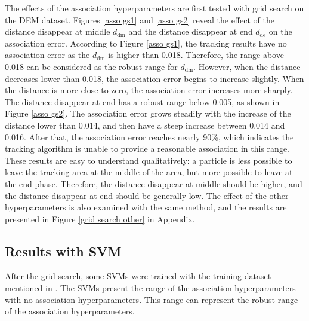 The effects of the association hyperparameters are first tested with grid search on the DEM dataset. Figures \ref{asso gs1} and \ref{asso gs2} reveal the effect of the distance disappear at middle $d_{\mathrm{dm}}$ and the distance disappear at end $d_{\mathrm{de}}$ on the association error. According to Figure \ref{asso gs1}, the tracking results have no association error as the $d_{\mathrm{dm}}$ is higher than 0.018. Therefore, the range above 0.018 can be considered as the robust range for $d_{\mathrm{dm}}$. However, when the distance decreases lower than 0.018, the association error begins to increase slightly. When the distance is more close to zero, the association error increases more sharply. The distance disappear at end has a robust range below 0.005, as shown in Figure \ref{asso gs2}. The association error grows steadily with the increase of the distance lower than 0.014, and then have a steep increase between 0.014 and 0.016. After that, the association error reaches nearly 90\%, which indicates the tracking algorithm is unable to provide a reasonable association in this range. These results are easy to understand qualitatively: a particle is less possible to leave the tracking area at the middle of the area, but more possible to leave at the end phase. Therefore, the distance disappear at middle should be higher, and the distance disappear at end should be generally low. The effect of the other hyperparameters is also examined with the same method, and the results are presented in Figure \ref{grid search other} in Appendix.






\subsection{Results with SVM}


After the grid search, some SVMs were trained with the training dataset mentioned in . The SVMs present the range of the association hyperparameters with no association hyperparameters. This range can represent the robust range of the association hyperparameters.

